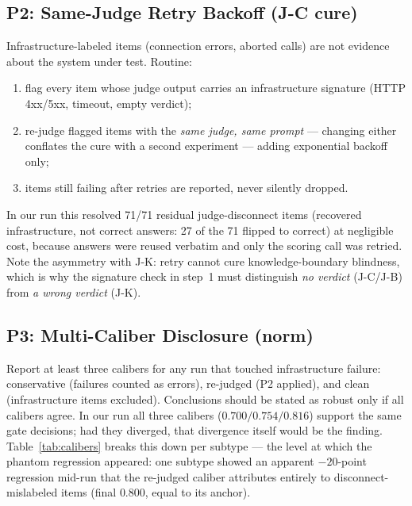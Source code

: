 \documentclass[11pt]{article}
\begin{document}
\subsection{P2: Same-Judge Retry Backoff (J-C cure)}
\label{sec:p2}
Infrastructure-labeled items (connection errors, aborted calls) are not
evidence about the system under test. Routine:
\begin{enumerate}\setlength{\itemsep}{-1pt}
\item flag every item whose judge output carries an infrastructure signature
      (HTTP 4xx/5xx, timeout, empty verdict);
\item re-judge flagged items with the \emph{same judge, same prompt} ---
      changing either conflates the cure with a second experiment --- adding
      exponential backoff only;
\item items still failing after retries are reported, never silently dropped.
\end{enumerate}
In our run this resolved 71/71 residual judge-disconnect items (recovered
infrastructure, not correct answers: 27 of the 71 flipped to correct) at negligible
cost, because answers were reused verbatim and only the scoring call was
retried. Note the asymmetry with J-K: retry cannot cure knowledge-boundary
blindness, which is why the signature check in step~1 must distinguish
\emph{no verdict} (J-C/J-B) from \emph{a wrong verdict} (J-K).

\subsection{P3: Multi-Caliber Disclosure (norm)}
Report at least three calibers for any run that touched infrastructure
failure: conservative (failures counted as errors), re-judged (P2 applied),
and clean (infrastructure items excluded). Conclusions should be stated as
robust only if all calibers agree. In our run all three calibers
($0.700/0.754/0.816$) support the same gate decisions; had they diverged,
that divergence itself would be the finding. Table~\ref{tab:calibers} breaks
this down per subtype --- the level at which the phantom regression appeared:
one subtype showed an apparent $-20$-point regression mid-run that the
re-judged caliber attributes entirely to disconnect-mislabeled items
(final $0.800$, equal to its anchor).
\end{document}
